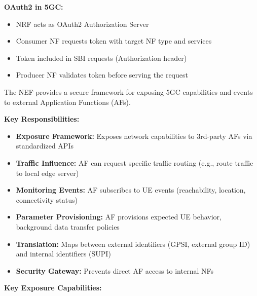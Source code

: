 \textbf{OAuth2 in 5GC:}

\begin{itemize}
\tightlist
\item
  NRF acts as OAuth2 Authorization Server
\item
  Consumer NF requests token with target NF type and services
\item
  Token included in SBI requests (Authorization header)
\item
  Producer NF validates token before serving the request
\end{itemize}


The NEF provides a secure framework for exposing 5GC capabilities and events to external Application Functions (AFs).

\textbf{Key Responsibilities:}

\begin{itemize}
\tightlist
\item
  \textbf{Exposure Framework:} Exposes network capabilities to 3rd-party AFs via standardized APIs
\item
  \textbf{Traffic Influence:} AF can request specific traffic routing (e.g., route traffic to local edge server)
\item
  \textbf{Monitoring Events:} AF subscribes to UE events (reachability, location, connectivity status)
\item
  \textbf{Parameter Provisioning:} AF provisions expected UE behavior, background data transfer policies
\item
  \textbf{Translation:} Maps between external identifiers (GPSI, external group ID) and internal identifiers (SUPI)
\item
  \textbf{Security Gateway:} Prevents direct AF access to internal NFs
\end{itemize}


\textbf{Key Exposure Capabilities:}

